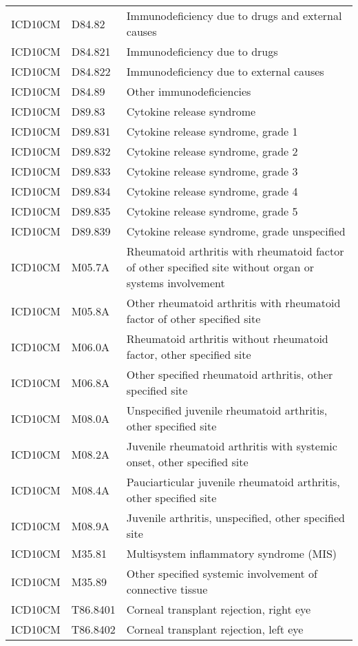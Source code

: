 \begin{table}[ht]
\begin{tabular}{lll}
  ICD10CM & D84.82 & Immunodeficiency due to drugs and external causes \\ 
  ICD10CM & D84.821 & Immunodeficiency due to drugs \\ 
  ICD10CM & D84.822 & Immunodeficiency due to external causes \\ 
  ICD10CM & D84.89 & Other immunodeficiencies \\ 
  ICD10CM & D89.83 & Cytokine release syndrome \\ 
  ICD10CM & D89.831 & Cytokine release syndrome, grade 1 \\ 
  ICD10CM & D89.832 & Cytokine release syndrome, grade 2 \\ 
  ICD10CM & D89.833 & Cytokine release syndrome, grade 3 \\ 
  ICD10CM & D89.834 & Cytokine release syndrome, grade 4 \\ 
  ICD10CM & D89.835 & Cytokine release syndrome, grade 5 \\ 
  ICD10CM & D89.839 & Cytokine release syndrome, grade unspecified \\ 
  ICD10CM & M05.7A & Rheumatoid arthritis with rheumatoid factor of other specified site without organ or systems involvement \\ 
  ICD10CM & M05.8A & Other rheumatoid arthritis with rheumatoid factor of other specified site \\ 
  ICD10CM & M06.0A & Rheumatoid arthritis without rheumatoid factor, other specified site \\ 
  ICD10CM & M06.8A & Other specified rheumatoid arthritis, other specified site \\ 
  ICD10CM & M08.0A & Unspecified juvenile rheumatoid arthritis, other specified site \\ 
  ICD10CM & M08.2A & Juvenile rheumatoid arthritis with systemic onset, other specified site \\ 
  ICD10CM & M08.4A & Pauciarticular juvenile rheumatoid arthritis, other specified site \\ 
  ICD10CM & M08.9A & Juvenile arthritis, unspecified, other specified site \\ 
  ICD10CM & M35.81 & Multisystem inflammatory syndrome (MIS) \\ 
  ICD10CM & M35.89 & Other specified systemic involvement of connective tissue \\ 
  ICD10CM & T86.8401 & Corneal transplant rejection, right eye \\ 
  ICD10CM & T86.8402 & Corneal transplant rejection, left eye \\ 

\end{tabular}
\end{table}
